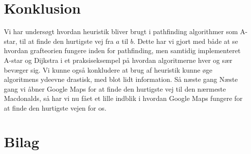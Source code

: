 \documentclass[12pt]{article}
\begin{document}
\section{Konklusion}
Vi har undersøgt hvordan heuristik bliver brugt i pathfinding algorithmer som A-star, til at finde den hurtigste vej fra $a$ til $b$. Dette har vi gjort med både at se hvordan grafteorien fungere inden for pathfinding, men samtidig implementeret A-star og Dijkstra i et praksiseksempel på hvordan algoritmerne hver og sær bevæger sig. Vi kunne også konkludere at brug af heuristik kunne øge algoritmens ydeevne drastisk, med blot lidt information. Så næste gang Næste gang vi åbner Google Maps for at finde den hurtigste vej til den nærmeste Macdonalds, så har vi nu fået et lille indblik i hvordan Google Maps fungere for at finde den hurtigste vejen for os. 
\newpage
\section*{Bilag}
\end{document}
